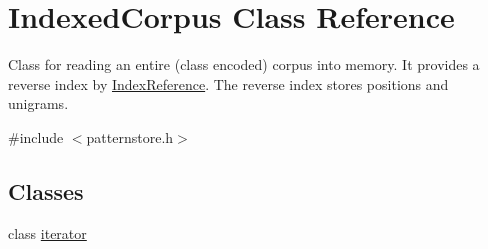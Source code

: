 \hypertarget{classIndexedCorpus}{}\section{Indexed\+Corpus Class Reference}
\label{classIndexedCorpus}


Class for reading an entire (class encoded) corpus into memory. It provides a reverse index by \hyperlink{classIndexReference}{Index\+Reference}. The reverse index stores positions and unigrams.  




{\ttfamily \#include $<$patternstore.\+h$>$}

\subsection*{Classes}
\begin{DoxyCompactItemize}
\item 
class \hyperlink{classIndexedCorpus_1_1iterator}{iterator}
\end{DoxyCompactItemize}
